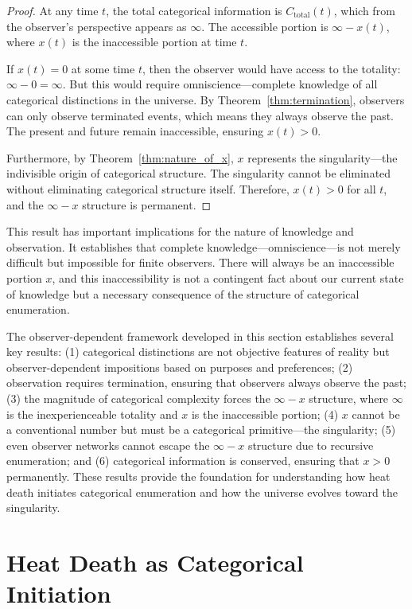 \documentclass[12pt,a4paper]{article}
\theoremstyle{definition}
\theoremstyle{remark}
\begin{document}
\begin{proof}
At any time $t$, the total categorical information is $C_{\text{total}}(t)$, which from the observer's perspective appears as $\infty$. The accessible portion is $\infty - x(t)$, where $x(t)$ is the inaccessible portion at time $t$.

If $x(t) = 0$ at some time $t$, then the observer would have access to the totality: $\infty - 0 = \infty$. But this would require omniscience—complete knowledge of all categorical distinctions in the universe. By Theorem~\ref{thm:termination}, observers can only observe terminated events, which means they always observe the past. The present and future remain inaccessible, ensuring $x(t) > 0$.

Furthermore, by Theorem~\ref{thm:nature_of_x}, $x$ represents the singularity—the indivisible origin of categorical structure. The singularity cannot be eliminated without eliminating categorical structure itself. Therefore, $x(t) > 0$ for all $t$, and the $\infty - x$ structure is permanent.
\end{proof}

This result has important implications for the nature of knowledge and observation. It establishes that complete knowledge—omniscience—is not merely difficult but impossible for finite observers. There will always be an inaccessible portion $x$, and this inaccessibility is not a contingent fact about our current state of knowledge but a necessary consequence of the structure of categorical enumeration.

The observer-dependent framework developed in this section establishes several key results: (1) categorical distinctions are not objective features of reality but observer-dependent impositions based on purposes and preferences; (2) observation requires termination, ensuring that observers always observe the past; (3) the magnitude of categorical complexity forces the $\infty - x$ structure, where $\infty$ is the inexperienceable totality and $x$ is the inaccessible portion; (4) $x$ cannot be a conventional number but must be a categorical primitive—the singularity; (5) even observer networks cannot escape the $\infty - x$ structure due to recursive enumeration; and (6) categorical information is conserved, ensuring that $x > 0$ permanently. These results provide the foundation for understanding how heat death initiates categorical enumeration and how the universe evolves toward the singularity.



\section{Heat Death as Categorical Initiation}
\label{sec:heat_death}
\end{document}
